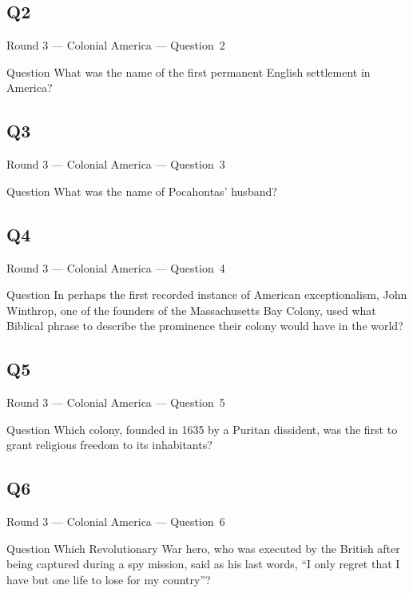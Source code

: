 \documentclass[11pt]{beamer}
\begin{document}
\subsection*{Q2}
\begin{frame}[t]{Round 3 --- Colonial America --- \mbox{Question 2}}
\vspace{-0.5em}
\begin{block}{Question}
What was the name of the first permanent English settlement in America?
\end{block}
\end{frame}
\subsection*{Q3}
\begin{frame}[t]{Round 3 --- Colonial America --- \mbox{Question 3}}
\vspace{-0.5em}
\begin{block}{Question}
What was the name of Pocahontas' husband?
\end{block}
\end{frame}
\subsection*{Q4}
\begin{frame}[t]{Round 3 --- Colonial America --- \mbox{Question 4}}
\vspace{-0.5em}
\begin{block}{Question}
In perhaps the first recorded instance of American exceptionalism, John Winthrop, one of the founders of the Massachusetts Bay Colony, used what Biblical phrase to describe the prominence their colony would have in the world?
\end{block}
\end{frame}
\subsection*{Q5}
\begin{frame}[t]{Round 3 --- Colonial America --- \mbox{Question 5}}
\vspace{-0.5em}
\begin{block}{Question}
Which colony, founded in 1635 by a Puritan dissident, was the first to grant religious freedom to its inhabitants?
\end{block}
\end{frame}
\subsection*{Q6}
\begin{frame}[t]{Round 3 --- Colonial America --- \mbox{Question 6}}
\vspace{-0.5em}
\begin{block}{Question}
Which Revolutionary War hero, who was executed by the British after being captured during a spy mission, said as his last words, ``I only regret that I have but one life to lose for my country''?
\end{block}
\end{frame}
\end{document}
